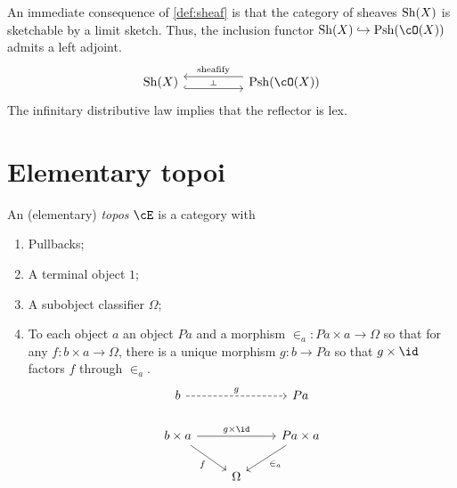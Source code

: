 \documentclass[article,10pt,oneside]{memoir}
\begin{document}
An immediate consequence of \cref{def:sheaf} is that the category of sheaves $\operatorname{Sh}(X)$ is sketchable by a limit sketch.
Thus, the inclusion functor $\Sh(X) \into \Psh(\cO(X))$ admits a left adjoint.
\[\begin{tikzcd}
    {\Sh(X)} && {\Psh(\cO(X))}
    \arrow[""{name=0, anchor=center, inner sep=0}, shift right=2, hook, from=1-1, to=1-3]
    \arrow[""{name=1, anchor=center, inner sep=0}, "{\text{sheafify}}"', shift right=2, from=1-3, to=1-1]
    \arrow["\dashv"{anchor=center, rotate=-90}, draw=none, from=1, to=0]
  \end{tikzcd}\]
The infinitary distributive law implies that the reflector is lex.

\section{Elementary topoi}
\label{sec:elementary-topoi}

\begin{defn}\label{def:topos}
  An (elementary) \emph{topos} $\cE$ is a category with
  \begin{enumerate}
  \item\label{def:topos-pullbacks} Pullbacks;
  \item\label{def:topos-terminal} A terminal object $1$;
  \item A subobject classifier $\Omega$;
  \item\label{def:topos-exponential} To each object $a$ an object $Pa$ and a morphism $\in_{a} : Pa \times a \to \Omega$ so that for any $f : b \times a \to \Omega$, there is a unique morphism $g : b \to Pa$ so that $g \times \id$ factors $f$ through $\in_{a}$.
    \[\begin{tikzcd}
	b && Pa \\
	{b \times a} && {Pa \times a} \\
	& \Omega
	\arrow["{\in_{a}}", from=2-3, to=3-2]
	\arrow["f"', from=2-1, to=3-2]
	\arrow["{g \times \id}", from=2-1, to=2-3]
	\arrow["g", dashed, from=1-1, to=1-3]
      \end{tikzcd}\]
  \end{enumerate}
\end{defn}
\end{document}
